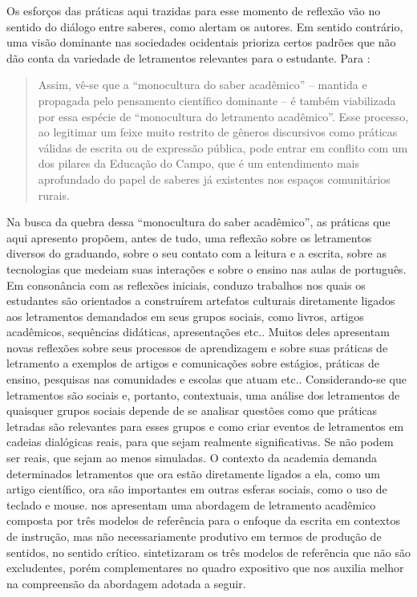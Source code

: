 \documentclass{textolivre}
\begin{document}
Os esforços das práticas aqui trazidas para esse momento de reflexão vão no sentido do diálogo entre saberes, como alertam os autores. Em sentido contrário, uma visão dominante nas sociedades ocidentais prioriza certos padrões que não dão conta da variedade de letramentos relevantes para o estudante. Para \textcite[p. 68]{magnani_da_2018}:

\begin{quote}
    Assim, vê-se que a “monocultura do saber acadêmico” \cite{santos_para_2005} – mantida e propagada pelo pensamento científico dominante – é também viabilizada por essa espécie de “monocultura do letramento acadêmico”. Esse processo, ao legitimar um feixe muito restrito de gêneros discursivos como práticas válidas de escrita ou de expressão pública, pode entrar em conflito com um dos pilares da Educação do Campo, que é um entendimento mais aprofundado do papel de saberes já existentes nos espaços comunitários rurais.
\end{quote}

Na busca da quebra dessa “monocultura do saber acadêmico”, as práticas que aqui apresento propõem, antes de tudo, uma reflexão sobre os letramentos diversos do graduando, sobre o seu contato com a leitura e a escrita, sobre as tecnologias que medeiam suas interações e sobre o ensino nas aulas de português. Em consonância com as reflexões iniciais, conduzo trabalhos nos quais os estudantes são orientados a construírem artefatos culturais diretamente ligados aos letramentos demandados em seus grupos sociais, como livros, artigos acadêmicos, sequências didáticas, apresentações etc.. Muitos deles apresentam novas reflexões sobre seus processos de aprendizagem e sobre suas práticas de letramento a exemplos de artigos e comunicações sobre estágios, práticas de ensino, pesquisas nas comunidades e escolas que atuam etc.. Considerando-se que letramentos são sociais e, portanto, contextuais, uma análise dos letramentos de quaisquer grupos sociais depende de se analisar questões como que práticas letradas são relevantes para esses grupos e como criar eventos de letramentos em cadeias dialógicas reais, para que sejam realmente significativas. Se não podem ser reais, que sejam ao menos simuladas. O contexto da academia demanda determinados letramentos que ora estão diretamente ligados a ela, como um artigo científico, ora são importantes em outras esferas sociais, como o uso de teclado e mouse. \textcite{lea_academic_2006} nos apresentam uma abordagem de letramento acadêmico composta por três modelos de referência para o enfoque da escrita em contextos de instrução, mas não necessariamente produtivo em termos de produção de sentidos, no sentido crítico. \textcite{silva_letramento_2013} sintetizaram os três modelos de referência \cite{lea_academic_2006} que não são excludentes, porém complementares no quadro expositivo que nos auxilia melhor na compreensão da abordagem adotada a seguir.
\end{document}
